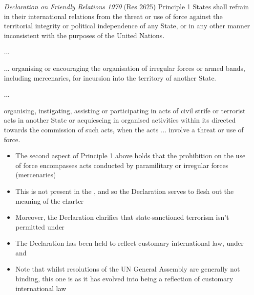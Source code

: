 \begin{conventiondetails}{\textit{Declaration on Friendly Relations 1970} (Res 2625) Principle 1}
    \flushleft
    States shall refrain in their international relations from the threat or use of force against the territorial integrity or political independence of any State, or in any other manner inconsistent with the purposes of the United Nations.

    \vspace{\baselineskip}

    ...

    \vspace{\baselineskip}

    ... organising or encouraging the organisation of irregular forces or armed bands, including mercenaries, for incursion into the territory of another State.

    \vspace{\baselineskip}

    ...

    \vspace{\baselineskip}

    organising, instigating, assisting or participating in acts of civil strife or terrorist acts in another State or acquiescing in organised activities within its directed towards the commission of such acts, when the acts ... involve a threat or use of force.
\end{conventiondetails}

\begin{itemize}
    \item The second aspect of Principle 1 above holds that the prohibition on the use of force encompasses acts conducted by paramilitary or irregular forces (mercenaries)
    \item This is not present in the , and so the Declaration serves to flesh out the meaning of the charter
    \item Moreover, the Declaration clarifies that state-sanctioned terrorism isn't permitted under 
    \item The Declaration has been held to reflect customary international law, under  and 
    \item Note that whilst resolutions of the UN General Assembly are generally not binding, this one is as it has evolved into being a reflection of customary international law
\end{itemize}

